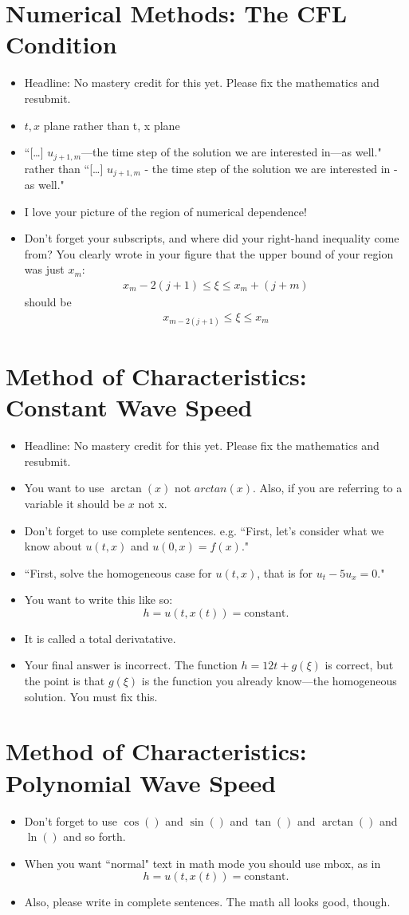 \documentclass{article}
\newcommand{\bea}{\begin{eqnarray*}}
\newcommand{\eea}{\end{eqnarray*}}
\begin{document}
\section{Numerical Methods: The CFL Condition}
\begin{itemize}
\item Headline: No mastery credit for this yet. Please fix the mathematics and resubmit.
\item $t, x$ plane rather than t, x plane
\item ``[\ldots] $u_{j+1,m}$---the time step of the solution we are interested in---as well." rather than ``[\ldots] $u_{j+1,m}$ - the time step of the solution we are interested in - as well."
\item I love your picture of the region of numerical dependence!
\item Don't forget your subscripts, and where did your right-hand inequality come from? You clearly wrote in your figure that the upper bound of your region was just $x_m$: \bea
 x_{m}-2(j+1) \leq \xi \leq  x_{m}+(j+m)
\eea should be \bea
 x_{m-2(j+1)} \leq \xi \leq  x_{m}
\eea
\end{itemize}
\section{Method of Characteristics: Constant Wave Speed}
\begin{itemize}
\item Headline: No mastery credit for this yet. Please fix the mathematics and resubmit.
\item You want to use $\arctan(x)$ not $arctan(x)$. Also, if you are referring to a variable it should be $x$ not x.
\item Don't forget to use complete sentences. e.g. ``First, let's consider what we know about $u(t,x)$ and $u(0,x)=f(x)$."
\item ``First, solve the homogeneous case for $u(t,x)$, that is for $u_t-5u_x=0$."
\item You want to write this like so: \[h = u(t,x(t)) = \mbox{constant}. \]
\item It is called a total derivatative.
\item Your final answer is incorrect. The function $h=12t+g(\xi)$ is correct, but the point is that $g(\xi)$ is the function you already know---the homogeneous solution. You must fix this.
\end{itemize}
\section{Method of Characteristics: Polynomial Wave Speed}
\begin{itemize}
\item Don't forget to use $\cos()$ and $\sin()$ and $\tan()$ and $\arctan()$ and $\ln()$ and so forth.
\item When you want ``normal" text in math mode you should use mbox, as in \[h = u(t,x(t)) = \mbox{constant}. \]
\item Also, please write in complete sentences. The math all looks good, though.
\end{itemize}
\end{document}
